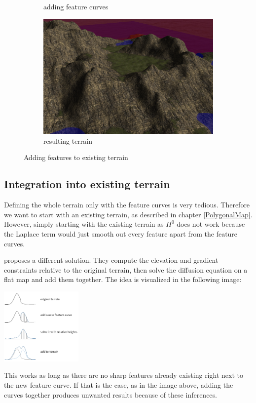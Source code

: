 \documentclass[journal, letterpaper]{IEEEtran}
\begin{document}
\begin{figure}
\begin{subfigure}[b]{0.3\textwidth}
		\caption{adding feature curves}
		\label{fig:featsExist2}
	\end{subfigure}
	\begin{subfigure}[b]{0.3\textwidth}
		\includegraphics[width=\textwidth]{images/diffusionEditExisting3}
		\caption{resulting terrain}
		\label{fig:featsExist3}
	\end{subfigure}
	\caption{Adding features to existing terrain}\label{fig:diffusion2}
\end{figure}
\subsection{Integration into existing terrain}
Defining the whole terrain only with the feature curves is very tedious. Therefore we want to start with an existing terrain, as described in chapter \ref{PolygonalMap}.
However, simply starting with the existing terrain as $H^0$ does not work because the Laplace term would just smooth out every feature apart from the feature curves.

\cite{FloraPonjouTasseArnaudEmilienMariePauleCaniStefanieHahmannAdrienBernhardt.2014} proposes a different solution. They compute the elevation and gradient constraints relative to the original terrain, then solve the diffusion equation on a flat map and add them together. The idea is visualized in the following image:
\begin{center}
	\includegraphics[width=0.30\textwidth]{images/DiffusionAddFeatures}
\end{center}
This works as long as there are no sharp features already existing right next to the new feature curve. If that is the case, as in the image above, adding the curves together produces unwanted results because of these inferences.
\end{document}
